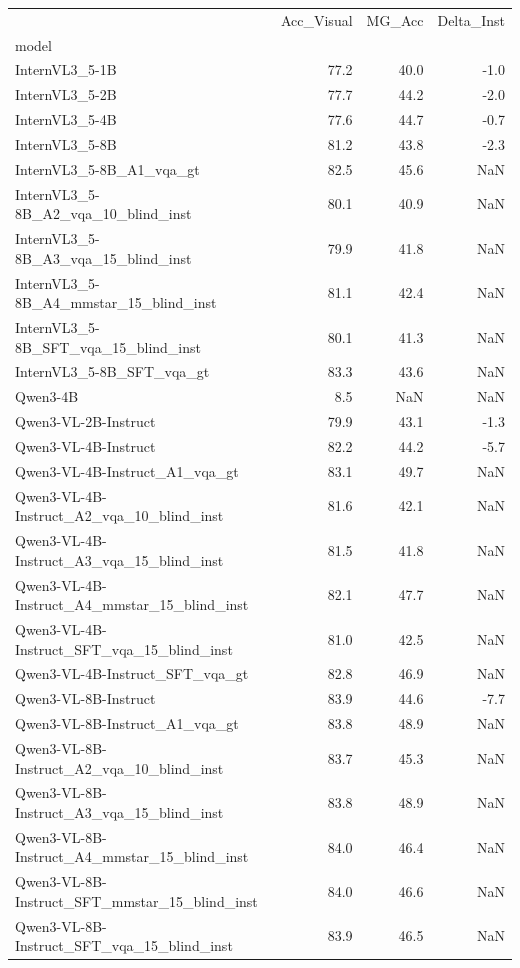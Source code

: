 \begin{tabular}{lrrr}
\toprule
 & Acc_Visual & MG_Acc & Delta_Inst \\
model &  &  &  \\
\midrule
InternVL3_5-1B & 77.2 & 40.0 & -1.0 \\
InternVL3_5-2B & 77.7 & 44.2 & -2.0 \\
InternVL3_5-4B & 77.6 & 44.7 & -0.7 \\
InternVL3_5-8B & 81.2 & 43.8 & -2.3 \\
InternVL3_5-8B_A1_vqa_gt & 82.5 & 45.6 & NaN \\
InternVL3_5-8B_A2_vqa_10_blind_inst & 80.1 & 40.9 & NaN \\
InternVL3_5-8B_A3_vqa_15_blind_inst & 79.9 & 41.8 & NaN \\
InternVL3_5-8B_A4_mmstar_15_blind_inst & 81.1 & 42.4 & NaN \\
InternVL3_5-8B_SFT_vqa_15_blind_inst & 80.1 & 41.3 & NaN \\
InternVL3_5-8B_SFT_vqa_gt & 83.3 & 43.6 & NaN \\
Qwen3-4B & 8.5 & NaN & NaN \\
Qwen3-VL-2B-Instruct & 79.9 & 43.1 & -1.3 \\
Qwen3-VL-4B-Instruct & 82.2 & 44.2 & -5.7 \\
Qwen3-VL-4B-Instruct_A1_vqa_gt & 83.1 & 49.7 & NaN \\
Qwen3-VL-4B-Instruct_A2_vqa_10_blind_inst & 81.6 & 42.1 & NaN \\
Qwen3-VL-4B-Instruct_A3_vqa_15_blind_inst & 81.5 & 41.8 & NaN \\
Qwen3-VL-4B-Instruct_A4_mmstar_15_blind_inst & 82.1 & 47.7 & NaN \\
Qwen3-VL-4B-Instruct_SFT_vqa_15_blind_inst & 81.0 & 42.5 & NaN \\
Qwen3-VL-4B-Instruct_SFT_vqa_gt & 82.8 & 46.9 & NaN \\
Qwen3-VL-8B-Instruct & 83.9 & 44.6 & -7.7 \\
Qwen3-VL-8B-Instruct_A1_vqa_gt & 83.8 & 48.9 & NaN \\
Qwen3-VL-8B-Instruct_A2_vqa_10_blind_inst & 83.7 & 45.3 & NaN \\
Qwen3-VL-8B-Instruct_A3_vqa_15_blind_inst & 83.8 & 48.9 & NaN \\
Qwen3-VL-8B-Instruct_A4_mmstar_15_blind_inst & 84.0 & 46.4 & NaN \\
Qwen3-VL-8B-Instruct_SFT_mmstar_15_blind_inst & 84.0 & 46.6 & NaN \\
Qwen3-VL-8B-Instruct_SFT_vqa_15_blind_inst & 83.9 & 46.5 & NaN \\

\end{tabular}

